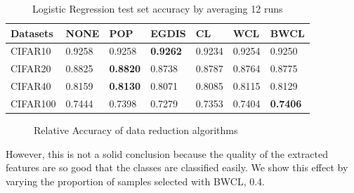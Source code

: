  
 \begin{table}[H]
    \centering
    \begin{tabular}{|l|l|l|l|l|l|l|}
    \hline
        Datasets & NONE & POP & EGDIS & CL & WCL & BWCL \\ \hline
        CIFAR10 & 0.9258 & 0.9258 & \textbf{0.9262} & 0.9234 & 0.9254 & 0.9250 \\ \hline
        CIFAR20 & 0.8825 & \textbf{0.8820} & 0.8738 & 0.8787 & 0.8764 & 0.8775 \\ \hline
        CIFAR40 & 0.8159 & \textbf{0.8130} & 0.8071 & 0.8085 & 0.8115 & 0.8129 \\ \hline
        CIFAR100 & 0.7444 & 0.7398 & 0.7279 & 0.7353 & 0.7404 & \textbf{0.7406} \\ \hline
    \end{tabular}
    \caption{Logistic Regression test set accuracy by averaging 12 runs}
    \label{lgtestacc}
\end{table}

\begin{figure}[H]
\centering  
{}
\caption{Relative Accuracy of data reduction algorithms}
\label{Fig.logistic_relativeacc}
\end{figure}

However, this is not a solid conclusion because the quality of the extracted features are so good that the classes are classified easily. We show this effect by varying the proportion of samples selected with BWCL, 0.4.

